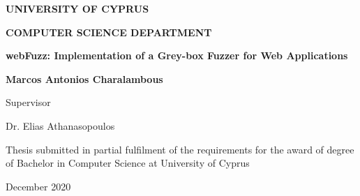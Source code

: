 \documentclass[12pt]{report}
\def\pname{webFuzz\xspace}
\def\ptitle{\pname: Implementation of a Grey-box Fuzzer for Web Applications}
\begin{document}
\begin{titlepage}

\begin{center}
\LARGE{\textbf{\MakeUppercase{University of Cyprus}}}

\Large{\textbf{\MakeUppercase{Computer Science Department}}}

\vspace*{5cm}

\large{\textbf{\ptitle{}}}

\vspace*{0.5cm}

\large{\textbf{Marcos Antonios Charalambous}}

\vspace*{5cm}

\normalsize{Supervisor}

\normalsize{Dr. Elias Athanasopoulos}

\vspace*{3cm}

\normalsize{Thesis submitted in partial fulfilment of the requirements for the award of degree of Bachelor in Computer Science at University of Cyprus}

\vspace*{2cm}

\normalsize{December 2020}
\end{center}

\end{titlepage}


\setlength{\parindent}{0em}
\setlength{\parskip}{1.0em}



\newpage



\dominitoc
\tableofcontents
\listoffigures
\listoftables











\balance


\begin{appendices}
	\titlespacing*{\chapter}{0pt}{0pt}{0pt}
	
	
	\clearpage
\end{appendices}
\end{document}
